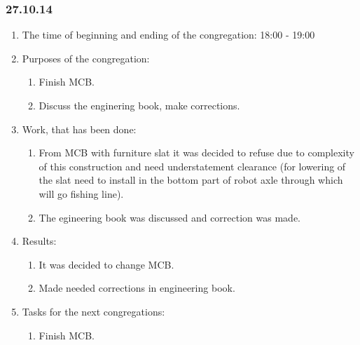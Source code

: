 	
\subsubsection{27.10.14}

\begin{enumerate}
	\item The time of beginning and ending of the congregation:
	18:00 - 19:00
	\item Purposes of the congregation:
	\begin{enumerate}
	  \item Finish MCB.
	  
	  \item Discuss the enginering book, make corrections.
	  
    \end{enumerate}
    
	\item Work, that has been done:
	\begin{enumerate}
	  \item From MCB with furniture slat it was decided to refuse due to complexity of this construction and need understatement clearance (for lowering of the slat need to install in the bottom part of robot axle through which will go fishing line).
      
      \item The egineering book was discussed and correction was made.
      
    \end{enumerate}
    
	\item Results:
	\begin{enumerate}
	  \item It was decided to change MCB.
	  
	  \item Made needed corrections in engineering book.
      
    \end{enumerate}
    
	\item Tasks for the next congregations:
	\begin{enumerate}
	  \item Finish MCB.
	  
    \end{enumerate}     
\end{enumerate}
\fillpage

